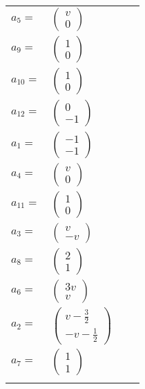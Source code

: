 \documentclass[1p]{elsarticle_modified}
\theoremstyle{definition}
\begin{document}
\begin{tabular}{m{7pt} m{180pt} m{7pt} m{180pt} }
\flushright $a_{5}=$&$\begin{pmatrix}v\\0\end{pmatrix}$ \\
\flushright $a_{9}=$&$\begin{pmatrix}1\\0\end{pmatrix}$ \\
\flushright $a_{10}=$&$\begin{pmatrix}1\\0\end{pmatrix}$ \\
\flushright $a_{12}=$&$\begin{pmatrix}0\\-1\end{pmatrix}$ \\
\flushright $a_{1}=$&$\begin{pmatrix}-1\\-1\end{pmatrix}$ \\
\flushright $a_{4}=$&$\begin{pmatrix}v\\0\end{pmatrix}$ \\
\flushright $a_{11}=$&$\begin{pmatrix}1\\0\end{pmatrix}$ \\
\flushright $a_{3}=$&$\begin{pmatrix}v\\- v\end{pmatrix}$ \\
\flushright $a_{8}=$&$\begin{pmatrix}2\\1\end{pmatrix}$ \\
\flushright $a_{6}=$&$\begin{pmatrix}3 v\\v\end{pmatrix}$ \\
\flushright $a_{2}=$&$\begin{pmatrix}v-\frac{3}{2}\\- v-\frac{1}{2}\end{pmatrix}$ \\
\flushright $a_{7}=$&$\begin{pmatrix}1\\1\end{pmatrix}$\\&\end{tabular}
\end{document}
